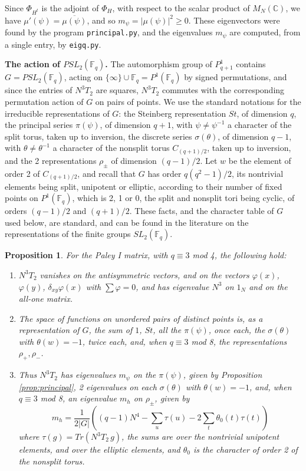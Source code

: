 \documentclass[11pt]{amsart}
\newtheorem{proposition}[theorem]{Proposition}
\begin{document}
\noindent Since $\Phi_{H^t}$ is the adjoint of $\Phi_H$, with respect to the scalar product of $M_N(\mathbb C)$, we have $\mu'(\psi)=\overline{\mu(\psi)}$, and so $m_\psi=|\mu(\psi)|^2\geq0$. These eigenvectors were found by the program \texttt{principal.py}, and the eigenvalues $m_\psi$ are computed, from a single entry, by \texttt{eigq.py}.

\medskip

\noindent\textbf{The action of $PSL_2(\mathbb F_q)$.} The automorphism group of $P^1_{q+1}$ contains $G=PSL_2(\mathbb F_q)$, acting on $\{\infty\}\cup\mathbb F_q=P^1(\mathbb F_q)$ by signed permutations, and since the entries of $N^3T_2$ are squares, $N^3T_2$ commutes with the corresponding permutation action of $G$ on pairs of points. We use the standard notations for the irreducible representations of $G$: the Steinberg representation $St$, of dimension $q$, the principal series $\pi(\psi)$, of dimension $q+1$, with $\psi\neq\psi^{-1}$ a character of the split torus, taken up to inversion, the discrete series $\sigma(\theta)$, of dimension $q-1$, with $\theta\neq\theta^{-1}$ a character of the nonsplit torus $C_{(q+1)/2}$, taken up to inversion, and the 2 representations $\rho_\pm$ of dimension $(q-1)/2$. Let $w$ be the element of order 2 of $C_{(q+1)/2}$, and recall that $G$ has order $q(q^2-1)/2$, its nontrivial elements being split, unipotent or elliptic, according to their number of fixed points on $P^1(\mathbb F_q)$, which is 2, 1 or 0, the split and nonsplit tori being cyclic, of orders $(q-1)/2$ and $(q+1)/2$. These facts, and the character table of $G$ used below, are standard, and can be found in the literature on the representations of the finite groups $SL_2(\mathbb F_q)$.

\begin{proposition}\label{prop:psl}
For the Paley I matrix, with $q\equiv3$ mod 4, the following hold:
\begin{enumerate}
\item $N^3T_2$ vanishes on the antisymmetric vectors, and on the vectors $\varphi(x)$, $\varphi(y)$, $\delta_{xy}\varphi(x)$ with $\sum\varphi=0$, and has eigenvalue $N^3$ on $1_N$ and on the all-one matrix.

\item The space of functions on unordered pairs of distinct points is, as a representation of $G$, the sum of $1$, $St$, all the $\pi(\psi)$, once each, the $\sigma(\theta)$ with $\theta(w)=-1$, twice each, and, when $q\equiv3$ mod 8, the representations $\rho_+,\rho_-$.

\item Thus $N^3T_2$ has eigenvalues $m_\psi$ on the $\pi(\psi)$, given by Proposition \ref{prop:principal}, 2 eigenvalues on each $\sigma(\theta)$ with $\theta(w)=-1$, and, when $q\equiv3$ mod 8, an eigenvalue $m_h$ on $\rho_\pm$, given by
$$m_h=\frac{1}{2|G|}\left((q-1)N^4-\sum_{u}\tau(u)-2\sum_t\theta_0(t)\tau(t)\right)$$
where $\tau(g)=Tr(N^3T_2\,g)$, the sums are over the nontrivial unipotent elements, and over the elliptic elements, and $\theta_0$ is the character of order 2 of the nonsplit torus.
\end{enumerate}
\end{proposition}
\end{document}
